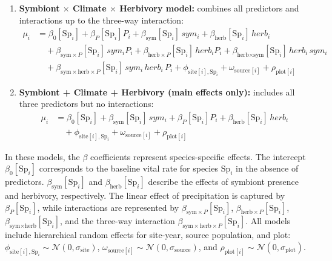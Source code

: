 \documentclass[12pt]{article}\usepackage[]{graphicx}\usepackage[dvipsnames]{xcolor}
\begin{document}
{\begin{enumerate}
    \item \textbf{Symbiont $\times$ Climate $\times$ Herbivory model:}
    combines all predictors and interactions up to the three-way
    interaction:
    \begin{align*}
    \mu_i &= \beta_0[\text{Sp}_i] + \beta_P[\text{Sp}_i] P_i
            + \beta_{\text{sym}}[\text{Sp}_i]\,sym_i
            + \beta_{\text{herb}}[\text{Sp}_i]\,herb_i \\
    &\quad + \beta_{\text{sym}\times P}[\text{Sp}_i]\,sym_i P_i
            + \beta_{\text{herb}\times P}[\text{Sp}_i]\,herb_i P_i
            + \beta_{\text{herb}\times \text{sym}}[\text{Sp}_i]\,herb_i\,sym_i \\
    &\quad + \beta_{\text{sym}\times \text{herb} \times P}[\text{Sp}_i]\,
            sym_i\,herb_i\,P_i
            + \phi_{\text{site}[i],\text{Sp}_i} + \omega_{\text{source}[i]}
            + \rho_{\text{plot}[i]}
    \end{align*}

    \item \textbf{Symbiont + Climate + Herbivory (main effects only):}
    includes all three predictors but no interactions:
    \begin{align*}
    \mu_i &= \beta_0[\text{Sp}_i] + \beta_{\text{sym}}[\text{Sp}_i]\,sym_i
            + \beta_P[\text{Sp}_i] P_i
            + \beta_{\text{herb}}[\text{Sp}_i]\,herb_i \\
    &\quad + \phi_{\text{site}[i],\text{Sp}_i} + \omega_{\text{source}[i]}
            + \rho_{\text{plot}[i]}
    \end{align*}
\end{enumerate}

In these models, the $\beta$ coefficients represent species-specific effects.
The intercept $\beta_0[\text{Sp}_i]$ corresponds to the baseline vital rate for species $\text{Sp}_i$ in the absence of predictors.
$\beta_{\text{sym}}[\text{Sp}_i]$ and $\beta_{\text{herb}}[\text{Sp}_i]$ describe the effects of symbiont presence and herbivory, respectively.
The linear effect of precipitation is captured by $\beta_P[\text{Sp}_i]$, while interactions are represented by $\beta_{\text{sym}\times P}[\text{Sp}_i]$, $\beta_{\text{herb}\times P}[\text{Sp}_i]$,
$\beta_{\text{sym}\times \text{herb}}[\text{Sp}_i]$, and the three-way interaction $\beta_{\text{sym}\times \text{herb} \times P}[\text{Sp}_i]$.
All models include hierarchical random effects for site-year, source population, and plot: $\phi_{\text{site}[i],\text{Sp}_i} \sim \mathcal{N}(0, \sigma_{\text{site}})$, $\omega_{\text{source}[i]} \sim \mathcal{N}(0, \sigma_{\text{source}})$,
and $\rho_{\text{plot}[i]} \sim \mathcal{N}(0, \sigma_{\text{plot}})$.

}
\end{document}
